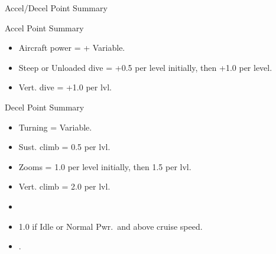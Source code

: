 \begin{table}
\centering
\caption{Accel/Decel Point Summary}
\medskip
Accel Point Summary\par
\medskip
\begin{minipage}{\linewidth}
\begin{itemize}
    \item Aircraft power = + Variable.
    \item Steep or Unloaded dive = +0.5 per level initially, then +1.0 per level.
    \item Vert. dive = +1.0 per lvl.
\end{itemize}
\end{minipage}
\medskip

Decel Point Summary\par
\medskip
\begin{minipage}{\linewidth}
\begin{itemize}
    \item Turning = Variable.
    \item Sust. climb = 0.5 per lvl.
    \item Zooms = 1.0 per level initially, then 1.5 per lvl.
    \item Vert. climb = 2.0 per lvl.
    \item {}
    \item 1.0 if Idle or Normal Pwr.\ and above cruise speed.
    \item {}
    .
\end{itemize}
\end{minipage}
\end{table}
